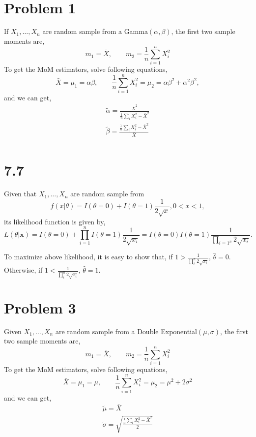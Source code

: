 \documentclass[letterpaper]{article}
\newcommand{\bx}{\mathbf{x}}
\begin{document}
    \section*{Problem 1}
    If $X_1, \dotsc, X_n$ are random sample from a Gamma$(\alpha, \beta)$, the first two sample moments are,
    \[
    m_1 = \bar X, \qquad m_2 = \frac{1}{n} \sum_{i=1}^n X_i^2
    \]
    To get the MoM estimators, solve following equations,
    \[
    \bar X = \mu_1 = \alpha \beta, \qquad \frac{1}{n} \sum_{i=1}^n X_i^2 = \mu_2 = \alpha \beta^2 + \alpha^2\beta^2,
    \]
    and we can get,
    \begin{eqnarray*}
    \tilde \alpha = \frac{\bar X^2}{\frac{1}{n} \sum_{i} X_i^2 - \bar X^2}\\
    \tilde \beta = \frac{\frac{1}{n} \sum_{i} X_i^2 - \bar X^2}{\bar X}\\
    \end{eqnarray*}
    
    \section*{7.7}
    Given that $X_1, \dotsc, X_n$ are random sample from 
    \[
    f(x|\theta) = I(\theta = 0) + I(\theta = 1) \frac{1}{2\sqrt{x}}, 0 < x < 1,
    \]
    its likelihood function is given by,
    \[
    L(\theta|\bx) = I(\theta = 0) + \prod_{i=1}^n I(\theta=1) \frac{1}{2\sqrt{x_i}} = I(\theta = 0) I(\theta=1) \frac{1}{\prod_{i=1^n} 2\sqrt{x_i}}.
    \]

    To maximize above likelihood, it is easy to show that, if $1 > \frac{1}{\prod_{i}^n 2 \sqrt{x_i}}$, $\hat \theta = 0$. Otherwise, if $1 < \frac{1}{\prod_{i}^n 2 \sqrt{x_i}}$, $\hat \theta = 1$.
    \section*{Problem 3}
    Given $X_1, \dotsc, X_n$ are random sample from a Double Exponential$(\mu, \sigma)$, the first two sample moments are,
    \[
    m_1 = \bar X, \qquad m_2 = \frac{1}{n} \sum_{i=1}^n X_i^2
    \]
    To get the MoM estimators, solve following equations,
    \[
    \bar X = \mu_1 = \mu, \qquad \frac{1}{n} \sum_{i=1}^n X_i^2 = \mu_2 =  \mu^2 + 2\sigma^2
    \]
    and we can get,
    \begin{eqnarray*}
    \tilde \mu = \bar X \\ 
    \tilde \sigma = \sqrt{\frac{\frac{1}{n} \sum_i X_i^2 - \bar X^2}{2}} 
    \end{eqnarray*}
\end{document}
